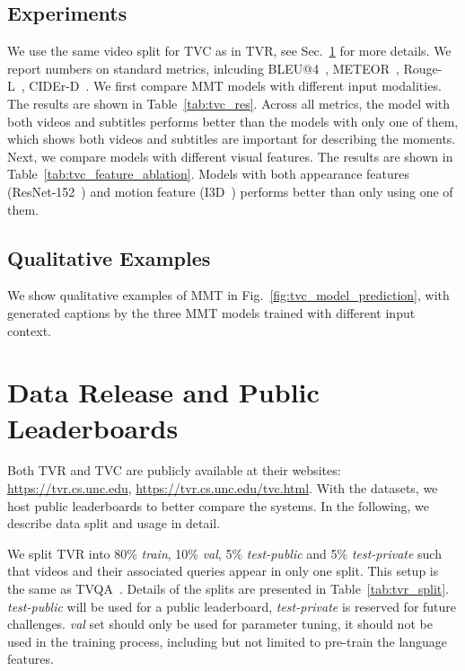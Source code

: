 \documentclass[runningheads]{llncs}
\begin{document}
\subsection{Experiments}
We use the same video split for TVC as in TVR, see Sec.~\ref{sec:data_release} for more details. We report numbers on standard metrics, inlcuding BLEU@4~\cite{papineni2002bleu},  METEOR~\cite{denkowski2014meteor}, Rouge-L~\cite{lin2004rouge}, CIDEr-D~\cite{vedantam2015cider}. 
We first compare MMT models with different input modalities. 
The results are shown in Table~\ref{tab:tvc_res}.
Across all metrics, the model with both videos and subtitles performs better than the models with only one of them, which shows both videos and subtitles are important for describing the moments.
Next, we compare models with different visual features. 
The results are shown in Table~\ref{tab:tvc_feature_ablation}. 
Models with both appearance features (ResNet-152~\cite{he2016deep}) and motion feature (I3D~\cite{carreira2017quo}) performs better than only using one of them. 


\subsection{Qualitative Examples}
We show qualitative examples of MMT in Fig.~\ref{fig:tvc_model_prediction}, with generated captions by the three MMT models trained with different input context.



 \section{Data Release and Public Leaderboards}\label{sec:data_release}
Both TVR and TVC are publicly available at their websites: \url{https://tvr.cs.unc.edu}, \url{https://tvr.cs.unc.edu/tvc.html}.
With the datasets, we host public leaderboards to better compare the systems.
In the following, we describe data split and usage in detail.


We split TVR into 80\% \textit{train}, 10\% \textit{val}, 5\% \textit{test-public} and 5\% \textit{test-private} such that videos and their associated queries appear in only one split.
This setup is the same as TVQA~\cite{Lei2018TVQALC}.
Details of the splits are presented in Table~\ref{tab:tvr_split}.
\textit{test-public} will be used for a public leaderboard, \textit{test-private} is reserved for future challenges. 
\textit{val} set should only be used for parameter tuning, it should not be used in the training process, including but not limited to pre-train the language features.
\end{document}
